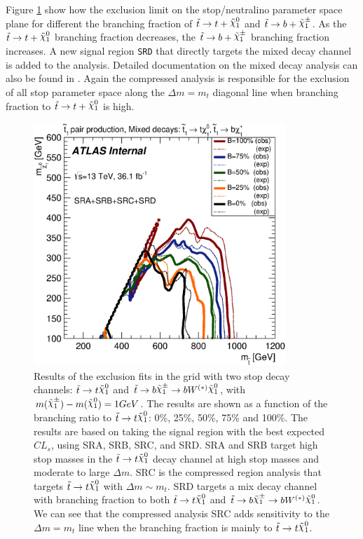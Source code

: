 \indent Figure \ref{figure.exclusion.SRABCD_dm1} show how the exclusion limit on the stop/neutralino parameter space plane for different the branching fraction of $\stop \rightarrow t+\ninoone$ and $\stop \rightarrow b+\chinoonepm$.  As the $\stop \rightarrow t+\ninoone$ branching fraction decreases, the $\stop \rightarrow b+\chinoonepm$ branching fraction increases.  A new signal region {\tt SRD} that directly targets the mixed decay channel is added to the analysis.  Detailed documentation on the mixed decay analysis can also be found in \cite{stop0Lmoriond}.  Again the compressed analysis is responsible for the exclusion of all stop parameter space along the $\Delta m = m_{t}$ diagonal line when branching fraction to $\stop \rightarrow t+\ninoone$ is high. \\

\begin{figure}[htbp]
	\begin{center}
		\includegraphics[width=0.85\textwidth]{figures/fit//SRABCD_mixed_dm1.eps}
		\caption{Results of the exclusion fits in the grid
                  with two stop decay channels: $\stop\ra t\ninoone$
                  and $\stop\ra b\chinoonepm\ra b
                  W^{(*)}\ninoone$, with $m(\chinoonepm)-m(\ninoone) =
                  1 GeV$.  The results are shown as a function of the
                  branching ratio to $\stop\ra t\ninoone$: 0\%, 25\%, 50\%, 75\% and 100\%.  
                  The results are based on taking the signal region with the best
                  expected $CL_s$, using SRA, SRB, SRC, and SRD.
                  SRA and SRB target high stop masses in the  $\stop\ra t\ninoone$ decay channel at high stop masses and moderate to large $\Delta m$.  SRC is the compressed region analysis that targets  $\stop\ra t\ninoone$ with $\Delta m \sim m_t$.  SRD targets a mix decay channel with branching fraction to both  $\stop\ra t\ninoone$ and $\stop\ra b\chinoonepm\ra b W^{(*)}\ninoone$.  We can see that the compressed analysis SRC adds sensitivity to the $\Delta m = m_t$ line when the branching fraction is mainly to $\stop\ra t\ninoone$.}
		\label{figure.exclusion.SRABCD_dm1}
	\end{center}
\end{figure}